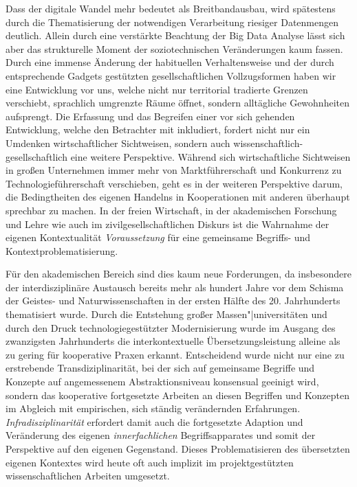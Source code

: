 \documentclass[a4paper,11pt]{article}
\begin{document}
Dass der digitale Wandel mehr bedeutet als Breitbandausbau, wird spätestens
durch die Thematisierung der notwendigen Verarbeitung riesiger Datenmengen
deutlich. Allein durch eine verstärkte Beachtung der Big Data Analyse lässt
sich aber das strukturelle Moment der soziotechnischen Veränderungen kaum
fassen. Durch eine immense Änderung der habituellen Verhaltensweise und der
durch entsprechende Gadgets gestützten gesellschaftlichen Vollzugsformen haben
wir eine Entwicklung vor uns, welche nicht nur territorial tradierte Grenzen
verschiebt, sprachlich umgrenzte Räume öffnet, sondern alltägliche
Gewohnheiten aufsprengt. Die Erfassung und das Begreifen einer vor sich
gehenden Entwicklung, welche den Betrachter mit inkludiert, fordert nicht nur
ein Umdenken wirtschaftlicher Sichtweisen, sondern auch
wissenschaftlich-gesellschaftlich eine weitere Perspektive. Während sich
wirtschaftliche Sichtweisen in großen Unternehmen immer mehr von
Marktführerschaft und Konkurrenz zu Technologieführerschaft verschieben, geht
es in der weiteren Perspektive darum, die Bedingtheiten des eigenen Handelns
in Kooperationen mit anderen überhaupt sprechbar zu machen. In der freien
Wirtschaft, in der akademischen Forschung und Lehre wie auch im
zivilgesellschaftlichen Diskurs ist die Wahrnahme der eigenen Kontextualität
\emph{Voraussetzung} für eine gemeinsame Begriffs- und
Kontextproblematisierung.

Für den akademischen Bereich sind dies kaum neue Forderungen, da insbesondere
der interdisziplinäre Austausch bereits mehr als hundert Jahre vor dem Schisma
der Geistes- und Naturwissenschaften in der ersten Hälfte des 20. Jahrhunderts
thematisiert wurde. Durch die Entstehung großer Massen"|universitäten und
durch den Druck technologiegestützter Modernisierung wurde im Ausgang des
zwanzigsten Jahrhunderts die interkontextuelle Übersetzungsleistung alleine
als zu gering für kooperative Praxen erkannt.  Entscheidend wurde nicht nur
eine zu erstrebende Transdiziplinarität, bei der sich auf gemeinsame Begriffe
und Konzepte auf angemessenem Abstraktionsniveau konsensual geeinigt wird,
sondern das kooperative fortgesetzte Arbeiten an diesen Begriffen und
Konzepten im Abgleich mit empirischen, sich ständig verändernden Erfahrungen.
\emph{Infradisziplinarität} erfordert damit auch die fortgesetzte Adaption und
Veränderung des eigenen \emph{innerfachlichen} Begriffsapparates und somit der
Perspektive auf den eigenen Gegenstand. Dieses Problematisieren des
übersetzten eigenen Kontextes wird heute oft auch implizit im
projektgestützten wissenschaftlichen Arbeiten umgesetzt.
\end{document}
